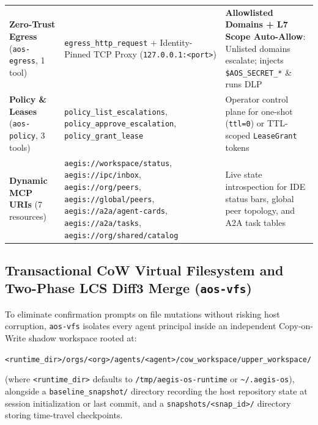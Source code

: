 \documentclass[acmsmall,screen,review]{acmart}
\begin{document}
\begin{table}[!t]
{\begin{tabular}{lll}
\textbf{Zero-Trust Egress} (\texttt{aos-egress}, 1 tool) & \texttt{egress\_http\_request} + Identity-Pinned TCP Proxy (\texttt{127.0.0.1:<port>}) & \textbf{Allowlisted Domains + L7 Scope Auto-Allow}: Unlisted domains escalate; injects \texttt{\$AOS\_SECRET\_*} \& runs DLP \\
\textbf{Policy \& Leases} (\texttt{aos-policy}, 3 tools) & \texttt{policy\_list\_escalations}, \texttt{policy\_approve\_escalation}, \texttt{policy\_grant\_lease} & Operator control plane for one-shot (\texttt{ttl=0}) or TTL-scoped \texttt{LeaseGrant} tokens \\
\textbf{Dynamic MCP URIs} (7 resources) & \texttt{aegis://workspace/status}, \texttt{aegis://ipc/inbox}, \texttt{aegis://org/peers}, \texttt{aegis://global/peers}, \texttt{aegis://a2a/agent-cards}, \texttt{aegis://a2a/tasks}, \texttt{aegis://org/shared/catalog} & Live state introspection for IDE status bars, global peer topology, and A2A task tables \\
\bottomrule
\end{tabular}%
}
\end{table}

\subsection{Transactional CoW Virtual Filesystem and Two-Phase LCS Diff3 Merge (\texttt{aos-vfs})}
\label{sec:vfs}

To eliminate confirmation prompts on file mutations without risking host corruption, \texttt{aos-vfs} isolates every agent principal inside an independent Copy-on-Write shadow workspace rooted at:
\begin{center}
{\footnotesize\texttt{<runtime\_dir>/orgs/<org>/agents/<agent>/cow\_workspace/\allowbreak upper\_workspace/}}
\end{center}
(where \texttt{<runtime\_dir>} defaults to \texttt{/tmp/\allowbreak aegis-os-runtime} or \texttt{\textasciitilde/.aegis-os}), alongside a \texttt{baseline\_snapshot/} directory recording the host repository state at session initialization or last commit, and a \texttt{snapshots/<snap\_id>/} directory storing time-travel checkpoints.
\end{document}
